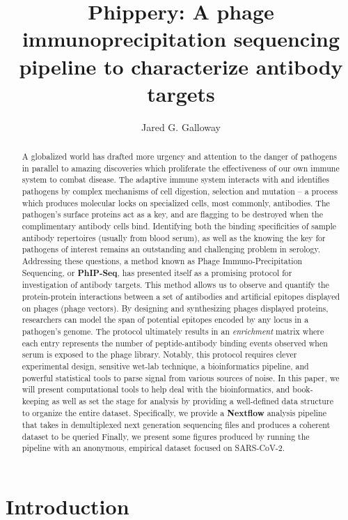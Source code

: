 \documentclass{article}
\title{Phippery: A phage immunoprecipitation sequencing pipeline to characterize antibody targets}
\author{Jared G. Galloway}
\begin{document}
\maketitle

\begin{abstract}
A globalized world has drafted more urgency and attention to the danger of pathogens in parallel to amazing discoveries which proliferate the effectiveness of our own immune system to combat disease.
The adaptive immune system interacts with and identifies pathogens by complex mechanisms of cell digestion, selection and mutation --
a process which produces molecular locks on specialized cells, most commonly, antibodies.
The pathogen's surface proteins act as a key, and are flagging to be destroyed when the complimentary antibody cells bind.
Identifying both the binding specificities of sample antibody repertoires (usually from blood serum), as well as the knowing the key for pathogens of interest remains an outstanding and challenging problem in serology. 
Addressing these questions, a method known as Phage Immuno-Precipitation Sequencing, or \textbf{PhIP-Seq}, has presented itself as a promising protocol for investigation of antibody targets.
This method allows us to observe and quantify the protein-protein interactions between a set of antibodies and artificial epitopes displayed on phages (phage vectors).
By designing and synthesizing phages displayed proteins, researchers can model the span of potential epitopes encoded by any locus in a pathogen's genome.
The protocol ultimately results in an \textit{enrichment} matrix where each entry represents the number of peptide-antibody binding events observed when serum is exposed to the phage library.
Notably, this protocol requires clever experimental design, sensitive wet-lab technique, a bioinformatics pipeline, and powerful statistical tools to parse signal from various sources of noise.
In this paper, we will present computational tools to help deal with the bioinformatics, and book-keeping as well as set the stage for analysis by providing a well-defined data structure to organize the entire dataset.
Specifically, we provide a \textbf{Nextflow} analysis pipeline that takes in demultiplexed next generation sequencing files and produces a coherent dataset to be queried
Finally, we present some figures produced by running the pipeline with an anonymous, empirical dataset focused on SARS-CoV-2.
\end{abstract}

\section*{Introduction}
\end{document}
